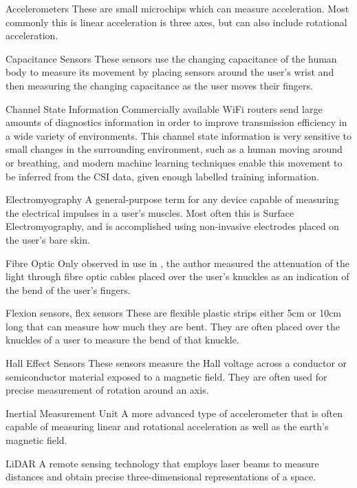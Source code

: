 \begin{Nomencl}[1cm]
\label{sym:tech}%
    \item[Accelerometers] These are small microchips which can measure acceleration. Most commonly this is linear acceleration is three axes, but can also include rotational acceleration.
    \item[Capacitance Sensors] These sensors use the changing capacitance of the human body to measure its movement by placing sensors around the user's wrist and then measuring the changing capacitance as the user moves their fingers.
    \item[Channel State Information] Commercially available WiFi routers send large amounts of diagnostics information in order to improve transmission efficiency in a wide variety of environments. This channel state information is very sensitive to small changes in the surrounding environment, such as a human moving around or breathing, and modern machine learning techniques enable this movement to be inferred from the CSI data, given enough labelled training information.
    \item[Electromyography] A general-purpose term for any device capable of measuring the electrical impulses in a user's muscles. Most often this is Surface Electromyography, and is accomplished using non-invasive electrodes placed on the user's bare skin.
    \item[Fibre Optic] Only observed in use in \cite{wiseEvaluationFiberOptic1990}, the author measured the attenuation of the light through fibre optic cables placed over the user's knuckles as an indication of the bend of the user's fingers.
    \item[Flexion sensors, flex sensors] These are flexible plastic strips either 5cm or 10cm long that can measure how much they are bent. They are often placed over the knuckles of a user to measure the bend of that knuckle.
    \item[Hall Effect Sensors] These sensors measure the Hall voltage across a conductor or semiconductor material exposed to a magnetic field. They are often used for precise measurement of rotation around an axis.
    \item[Inertial Measurement Unit] A more advanced type of accelerometer that is often capable of measuring linear and rotational acceleration as well as the earth's magnetic field.
    \item[LiDAR] A remote sensing technology that employs laser beams to measure distances and obtain precise three-dimensional representations of a space.

\end{Nomencl}
